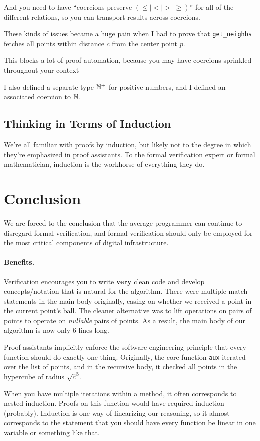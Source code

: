 \documentclass{article}
\begin{document}
And you need to have ``coercions preserve $(\leq \mid < \mid > \mid \geq)$'' for all of the different relations, so you can transport results across coercions.

These kinds of issues became a huge pain when I had to prove that \texttt{get\_neighbs} fetches all points within distance $c$ from the center point $p$.

This blocks a lot of proof automation, because you may have coercions sprinkled throughout your context

I also defined a separate type $\mathbb{N}^+$ for positive numbers, and I defined an associated coercion to $\mathbb{N}$.

\subsection{Thinking in Terms of Induction}
We're all familiar with proofs by induction, but likely not to the degree in which they're emphasized in proof assistants.
To the formal verification expert or formal mathematician, induction is the workhorse of everything they do.

\section{Conclusion}
We are forced to the conclusion that the average programmer can continue to disregard formal verification, and formal verification should only be employed for the most critical components of digital infrastructure.

\paragraph{Benefits.}
Verification encourages you to write \textbf{very} clean code and develop concepts/notation that is natural for the algorithm.
There were multiple match statements in the main body originally, casing on whether we received a point in the current point's ball.
The cleaner alternative was to lift operations on pairs of points to operate on \textit{nullable} pairs of points.
As a result, the main body of our algorithm is now only 6 lines long.

Proof assistants implicitly enforce the software engineering principle that every function should do exactly one thing.
Originally, the core function \texttt{aux} iterated over the list of points, and in the recursive body, it checked all points in the hypercube of radius $\sqrt{c}^{\mathbb{Z}}$.

When you have multiple iterations within a method, it often corresponds to nested induction.
Proofs on this function would have required induction (probably).
Induction is one way of linearizing our reasoning, so it almost corresponds to the statement that you should have every function be linear in one variable or something like that.
\end{document}

